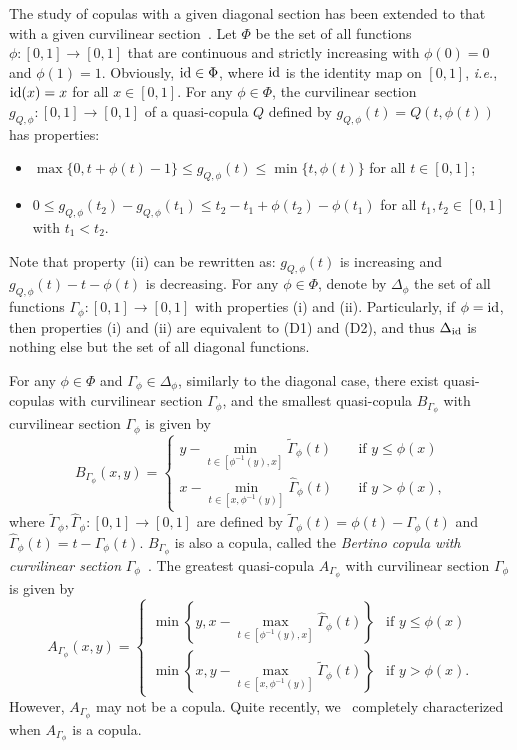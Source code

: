 \documentclass[12pt]{article}
\theoremstyle{plain}
\theoremstyle{definition}
\begin{document}
The study of copulas with a given diagonal section has been extended to that with a given curvilinear section~\cite{BMJ19}.
Let $\Phi$ be the set of all functions $\phi: [0, 1]\to [0, 1]$ that are continuous and strictly increasing with $\phi(0)=0$ and $\phi(1)=1$.
Obviously, ${\rm id}\in\Phi$, where ${\rm id}$ is the identity map on $[0, 1]$, \emph{i.e.}, ${\rm id}(x)=x$ for all $x\in [0, 1]$.
For any $\phi\in\Phi$, the curvilinear section $g_{Q, \phi}: [0, 1]\to [0, 1]$ of a quasi-copula $Q$ defined by $g_{Q, \phi}(t)=Q(t, \phi(t))$ has properties:
\begin{itemize}\setlength{\itemindent}{10pt}
\item[{\rm (i)}] $\max\{0, t+\phi(t)-1\}\leq g_{Q,\phi}(t)\leq\min\{t, \phi(t)\}$ for all $t\in [0, 1]$;
\item[{\rm (ii)}] $0\leq g_{Q,\phi}(t_2)-g_{Q,\phi}(t_1)\leq t_2-t_1+\phi(t_2)-\phi(t_1)$ for all $t_1, t_2\in [0, 1]$ with $t_1<t_2$.
\end{itemize}
Note that property (ii) can be rewritten as: $g_{Q, \phi}(t)$ is increasing and $g_{Q, \phi}(t)-t-\phi(t)$ is decreasing.
For any $\phi\in\Phi$, denote by $\Delta_\phi$ the set of all functions $\Gamma_\phi: [0, 1]\to [0, 1]$ with properties (i) and (ii).
Particularly, if $\phi={\rm id}$, then properties (i) and (ii) are equivalent to (D1) and (D2), and thus $\Delta_{\rm id}$ is nothing else but the set of all diagonal functions.

For any $\phi\in\Phi$ and $\Gamma_\phi\in\Delta_\phi$, similarly to the diagonal case, there exist quasi-copulas with curvilinear section $\Gamma_\phi$,
and the smallest quasi-copula $B_{\Gamma_\phi}$ with curvilinear section $\Gamma_\phi$ is given by
\[
B_{\Gamma_\phi}(x, y) =\left \{
        \begin {array}{ll}
         y-\min\limits_{t\in[\phi^{-1}(y), x]}\tilde{\Gamma}_\phi(t)
                  &\quad \text{if\ \ $y\leq\phi(x)$}  \\[2mm]
           x-\min\limits_{t\in[x, \phi^{-1}(y)]}\hat{\Gamma}_\phi(t)
                  &\quad \text{if\ \ $y>\phi(x)$,}
        \end {array}
       \right.
\]
where $\tilde{\Gamma}_\phi, \hat{\Gamma}_\phi: [0, 1]\to [0, 1]$ are defined by $\tilde{\Gamma}_\phi(t)=\phi(t)-\Gamma_\phi(t)$ and $\hat{\Gamma}_\phi(t)=t-\Gamma_\phi(t)$. $B_{\Gamma_\phi}$ is also a copula, called the \emph{Bertino copula with curvilinear section} $\Gamma_\phi$~\cite{BMJ19}.
The greatest quasi-copula $A_{\Gamma_\phi}$ with curvilinear section $\Gamma_\phi$ is given by
\[
A_{\Gamma_\phi}(x, y) =\left \{
        \begin {array}{ll}
         \min\left\{y, x-\max\limits_{t\in[\phi^{-1}(y), x]}\hat{\Gamma}_\phi(t)\right\}
                  & \text{if\ \ $y\leq\phi(x)$}  \\[2mm]
           \min\left\{x, y-\max\limits_{t\in[x, \phi^{-1}(y)]}\tilde{\Gamma}_\phi(t)\right\}
                  & \text{if\ \ $y>\phi(x)$.}
        \end {array}
       \right.
       \]
However, $A_{\Gamma_\phi}$ may not be a copula. Quite recently, we~\cite{OSZ25} completely characterized when $A_{\Gamma_\phi}$ is a copula.
\end{document}

